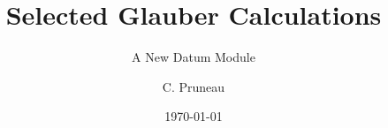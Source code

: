 \documentclass{beamer}
\title{Selected Glauber Calculations}
\subtitle{A New Datum Module}
\author{C. Pruneau}
\institute{Wayne State University}
\date{\today}
\begin{document}
\begin{frame}
\titlepage
\end{frame}
\end{document}
